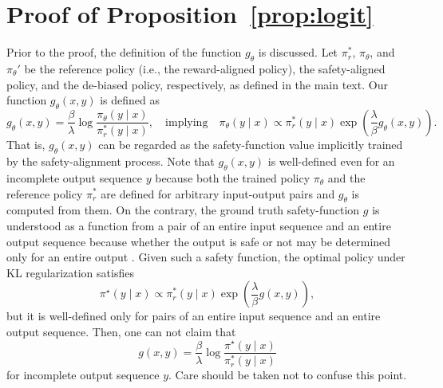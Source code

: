 \newpage
\section{Proof of Proposition~\ref{prop:logit}}\label{apdx:proof}
Prior to the proof, the definition of the function $g_\theta$ is discussed.
Let $\pi_r^*$, $\pi_{\theta}$, and $\pi_{\theta}'$ be the reference policy (i.e., the reward-aligned policy), the safety-aligned policy, and the de-biased policy, respectively, as defined in the main text. Our function $g_\theta(x, y)$ is defined as
\begin{equation*}
g_\theta(x, y) = \frac{\beta}{\lambda} \log \frac{\pi_\theta(y \mid x)}{\pi_r^*(y \mid x)}, \quad \text{implying} \quad 
\pi_\theta(y \mid x) \propto \pi_r^* (y \mid x) \exp\left( \frac{\lambda}{\beta} g_\theta(x, y) \right).
\end{equation*}
That is, $g_\theta(x, y)$ can be regarded as the safety-function value implicitly trained by the safety-alignment process.
Note that $g_{\theta}(x, y)$ is well-defined even for an incomplete output sequence $y$ because both the trained policy $\pi_\theta$ and the reference policy $\pi_r^*$ are defined for arbitrary input-output pairs and $g_\theta$ is computed from them.
On the contrary, the ground truth safety-function $g$ is understood as a function from a pair of an entire input sequence and an entire output sequence because whether the output is safe or not may be determined only for an entire output \cite{mudgal24a}. Given such a safety function, the optimal policy under KL regularization satisfies
\begin{equation*}
\pi^\star(y \mid x) \propto \pi_r^* (y \mid x) \exp\left( \frac{\lambda}{\beta} g(x, y) \right),
\end{equation*}
but it is well-defined only for pairs of an entire input sequence and an entire output sequence.
Then, one can not claim that
\begin{equation*}
g(x, y) = \frac{\beta}{\lambda} \log \frac{\pi^\star(y \mid x)}{\pi_r^*(y \mid x)}
\end{equation*}
for incomplete output sequence $y$. 
Care should be taken not to confuse this point.

